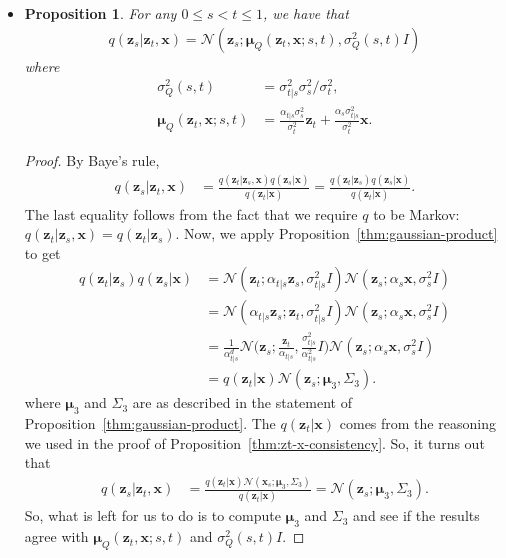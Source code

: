 \documentclass[10pt]{article}
\newtheorem{proposition}[lemma]{Proposition}
\newcommand{\ve}[1]{\mathbf{#1}}
\newcommand{\ves}[1]{\boldsymbol{#1}}
\newcommand{\N}{\mathcal{N}}
\begin{document}
\begin{itemize}
\item \begin{proposition}
  For any $0 \leq s < t \leq 1$, we have that
  \begin{align*}
    q(\ve{z}_s|\ve{z}_t, \ve{x}) = \N(\ve{z}_s; \ves{\mu}_Q(\ve{z}_t, \ve{x}; s, t), \sigma^2_Q(s,t) I )
  \end{align*}
  where
  \begin{align*}
    \sigma_Q^{2}(s,t) &= \sigma_{t|s}^2 \sigma_s^2 / \sigma_t^2, \\
    \ves{\mu}_Q(\ve{z}_t, \ve{x}; s, t) &= \frac{\alpha_{t|s}\sigma_s^2}{\sigma_t^2} \ve{z}_t + \frac{\alpha_s \sigma_{t|s}^2}{\sigma_t^2} \ve{x}.
  \end{align*}
\end{proposition}

\begin{proof}
  By Baye's rule,
  \begin{align*}
    q(\ve{z}_s|\ve{z}_t, \ve{x}) 
    &= \frac{q(\ve{z}_t | \ve{z}_s, \ve{x}) q(\ve{z}_s|\ve{x})}{q(\ve{z}_t|\ve{x})}
    = \frac{q(\ve{z}_t | \ve{z}_s) q(\ve{z}_s|\ve{x})}{q(\ve{z}_t|\ve{x})}.
  \end{align*}
  The last equality follows from the fact that we require $q$ to be Markov: $q(\ve{z}_t|\ve{z}_s,\ve{x}) = q(\ve{z}_t|\ve{z}_s)$. Now, we apply Proposition~\ref{thm:gaussian-product} to get
  \begin{align*}
    q(\ve{z}_t | \ve{z}_s) q(\ve{z}_s|\ve{x})
    &= \N(\ve{z}_t; \alpha_{t|s} \ve{z}_s, \sigma^2_{t|s} I) \N(\ve{z}_s; \alpha_s \ve{x},  \sigma_s^2 I) \\
    &= \N(\alpha_{t|s} \ve{z}_s; \ve{z}_t, \sigma^2_{t|s} I) \N(\ve{z}_s; \alpha_s \ve{x},  \sigma_s^2 I) \\
    &= \frac{1}{\alpha_{t|s}^d} \N\bigg(\ve{z}_s ; \frac{\ve{z}_t}{\alpha_{t|s}}, \frac{\sigma^2_{t|s}}{\alpha_{t|s}^2} I\bigg) \N(\ve{z}_s ; \alpha_s \ve{x}, \sigma_s^2 I) \\
    &= q(\ve{z}_t|\ve{x}) \N(\ve{z}_s; \ves{\mu}_3, \Sigma_3).
  \end{align*}
  where $\ves{\mu}_3$ and $\Sigma_3$ are as described in the statement of Proposition~\ref{thm:gaussian-product}. The $q(\ve{z}_t|\ve{x})$ comes from the reasoning we used in the proof of Proposition~\ref{thm:zt-x-consistency}. So, it turns out that
  \begin{align*}
    q(\ve{z}_s|\ve{z}_t, \ve{x}) &= \frac{q(\ve{z}_t|\ve{x}) \N(\ve{x}_s; \ves{\mu}_3, \Sigma_3)}{q(\ve{z}_t|\ve{x})} = \N(\ve{z}_s; \ves{\mu}_3, \Sigma_3).
  \end{align*}
  So, what is left for us to do is to compute $\ves{\mu}_3$ and $\Sigma_3$ and see if the results agree with $\ves{\mu}_Q(\ve{z}_t,\ve{x}; s, t)$ and $\sigma_Q^2(s,t) I$. 
  

\end{proof}
\end{itemize}
\end{document}
